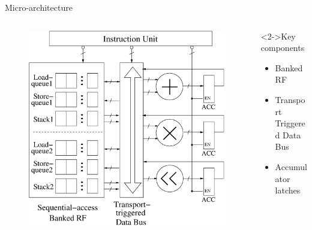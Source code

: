 \documentclass{beamer}
\begin{document}
\begin{CJK}{UTF8}{bkai}
            \begin{frame}{Micro-architecture}
                \begin{columns}
                    \begin{column}{0.6\textwidth}
                        \begin{figure}[!ht] 
                            \centering
                            \includegraphics[width=1.0\textwidth]{./figs/micro.eps}
                        \end{figure}
                    \end{column}
                    \begin{column}{0.35\textwidth}
                        \begin{block}<2->{Key components}
                            \begin{itemize}
                                \item <3->{Banked RF}
                                \item <4->{Transport Triggered Data Bus}
                                \item <5->{Accumulator latches}
                            \end{itemize}    
                        \end{block}
                    \end{column}
                \end{columns}
            \end{frame}


\end{CJK}
\end{document}
